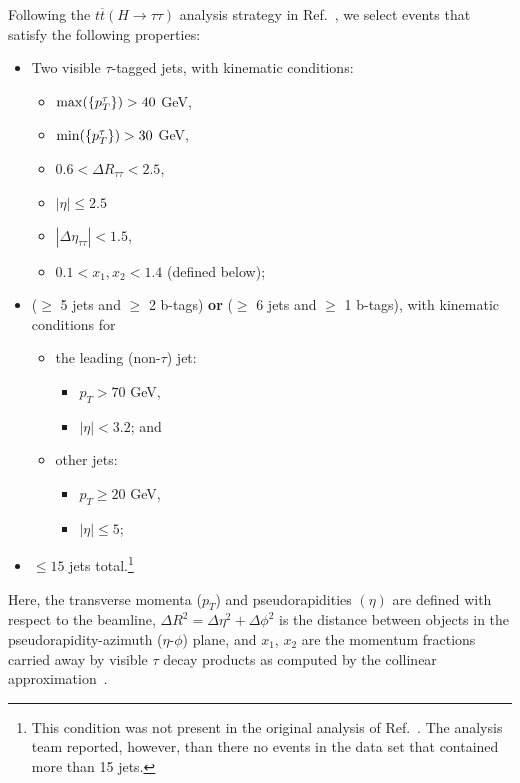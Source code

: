 \documentclass[aps,prd,twocolumn,superscriptaddress,floatfix,longbibliography,preprintnumbers,nofootinbib]{revtex4-1} %
\DeclareRobustCommand{\RRef}[1]{Ref.~\cite{#1}}
\begin{document}
Following the $t\overline{t}(H\rightarrow\tau\tau)$ analysis strategy in \RRef{ATLAS:2022yrq}, we select events that satisfy the following properties:
%
\begin{itemize}
  \item Two visible $\tau$-tagged jets, with kinematic conditions: 
   \begin{itemize}
    \item \({\rm max}(\{p_T^\tau\})>40\) GeV,
    \item \({\rm min}(\{p_T^\tau\})>30\) GeV,
    \item \(0.6<\Delta R_{\tau\tau}<2.5\),
    \item \(|\eta|\leq 2.5\) 
    \item \(|\Delta \eta_{\tau\tau}|<1.5\),
    \item \(0.1<x_1,x_2<1.4\) (defined below);
  \end{itemize}
  \item ($\geq$ 5 jets and $\geq$ 2 b-tags) \textbf{or} ($\geq$ 6 jets and $\geq$ 1 b-tags), with kinematic conditions for 
    \begin{itemize}
      \item the leading (non-\(\tau\)) jet:
  \begin{itemize}
    \item \(p_T>70\) GeV,
    \item \(|\eta|<3.2\); and
  \end{itemize}
\item other jets: 
  \begin{itemize}
    \item \(p_T \geq 20\) GeV,
    \item \(|\eta|\leq 5\); 
  \end{itemize}
    \end{itemize}  \item $\leq 15$ jets total.\footnote{This condition was not present in the original analysis of \RRef{ATLAS:2022yrq}.  The analysis team reported, however, than there no events in the data set that contained more than 15 jets.}
\end{itemize}
%
Here, the transverse momenta (\(p_T\)) and pseudorapidities \((\eta)\) are defined with respect to the beamline, $\Delta R^2 = \Delta \eta^2 + \Delta \phi^2$ is the distance between objects in the pseudorapidity-azimuth ($\eta$-$\phi$) plane, and $x_1$, $x_2$ are the momentum fractions carried away by visible \(\tau\) decay products as computed by the collinear approximation~\cite{Ellis:1987xu, Elagin:2010aw, Konar:2016wbh}.
%
\end{document}
